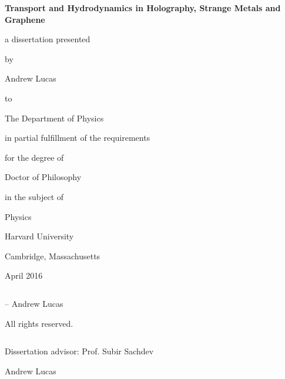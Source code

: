 \documentclass[10pt, oneside]{book}
\begin{document}
\begin{doublespace}


\setcounter{secnumdepth}{3}

\pagestyle{fancy}
\renewcommand{\headrulewidth}{0pt}
\fancyhead{}

\fancyfoot{}
\fancyfoot[C] {\thepage}

\allowdisplaybreaks

\thispagestyle{empty}
$\;$

\pagebreak

\thispagestyle{empty}

$\;$

\vspace{1in}

\begin{center}
{\huge \textbf{Transport and Hydrodynamics in Holography, Strange Metals and Graphene}}


\vspace{0.5 in}

a dissertation presented 

by 

Andrew Lucas

to

The Department of Physics

$\;$ \\

in partial fulfillment of the requirements

for the degree of 

Doctor of Philosophy

in the subject of

Physics

$\;$ \\

Harvard University

Cambridge, Massachusetts

April 2016

\end{center}

\pagebreak

\thispagestyle{empty}

$\;$



\vspace{3in}

 -- Andrew Lucas


All rights reserved.

\pagebreak


\renewcommand{\thepage}{\roman{page}}
\setcounter{page}{3}
$\;$\\
\begin{minipage}{0.5\textwidth}
\begin{flushleft}
Dissertation advisor:  Prof. Subir Sachdev   
\end{flushleft}
\end{minipage}
\begin{minipage}{0.5\textwidth}
\begin{flushright}
    Andrew Lucas
\end{flushright}
\end{minipage}


\end{doublespace}
\end{document}

